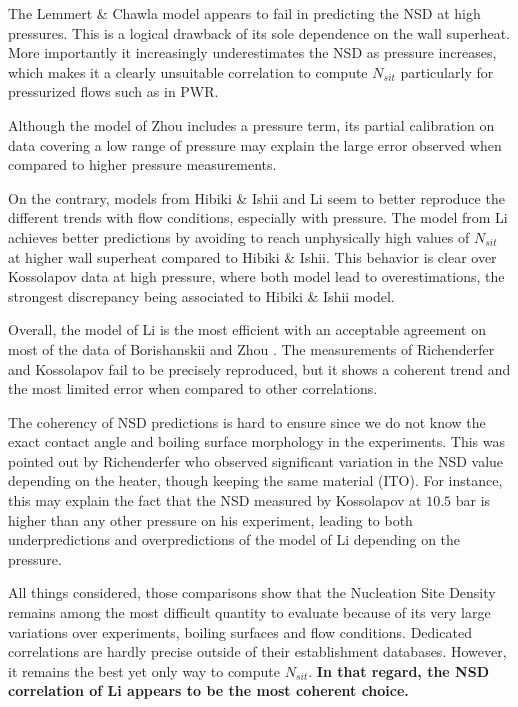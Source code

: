 The Lemmert \& Chawla model appears to fail in predicting the NSD at high pressures. This is a logical drawback of its sole dependence on the wall superheat. More importantly it increasingly underestimates the NSD as pressure increases, which makes it a clearly unsuitable correlation to compute $N_{sit}$ particularly for pressurized flows such as in PWR.

\npar
Although the model of Zhou \etal includes a pressure term, its partial calibration on data covering a low range of pressure may explain the large error observed when compared to higher pressure measurements.

\npar
On the contrary, models from Hibiki \& Ishii and Li \etal seem to better reproduce the different trends with flow conditions, especially with pressure. The model from Li \etal achieves better predictions by avoiding to reach unphysically high values of $N_{sit}$ at higher wall superheat compared to Hibiki \& Ishii. This behavior is clear over Kossolapov data at high pressure, where both model lead to overestimations, the strongest discrepancy being associated to Hibiki \& Ishii model.

\npar
Overall, the model of Li \etal is the most efficient with an acceptable agreement on most of the data of Borishanskii and Zhou \etal. The measurements of Richenderfer and Kossolapov fail to be precisely reproduced, but it shows a coherent trend and the most limited error when compared to other correlations.

\npar
\begin{remark*}{}
The coherency of NSD predictions is hard to ensure since we do not know the exact contact angle and boiling surface morphology in the experiments. This was pointed out by Richenderfer \cite{richenderfer_experimental_2018} who observed significant variation in the NSD value depending on the heater, though keeping the same material (ITO). For instance, this may explain the fact that the NSD measured by Kossolapov at $10.5$ bar is higher than any other pressure on his experiment, leading to both underpredictions and overpredictions of the model of Li \etal depending on the pressure.
\end{remark*}

\npar
All things considered, those comparisons show that the Nucleation Site Density remains among the most difficult quantity to evaluate because of its very large variations over experiments, boiling surfaces and flow conditions. Dedicated correlations are hardly precise outside of their establishment databases. However, it remains the best yet only way to compute $N_{sit}$. \textbf{In that regard, the NSD correlation of Li \etal appears to be the most coherent choice.}












